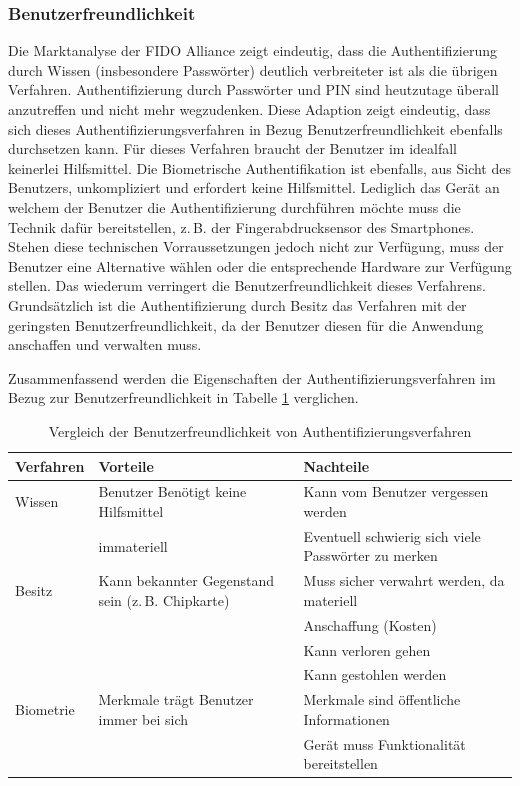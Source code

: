\documentclass[11pt,a4paper,ngerman]{scrreprt}
\begin{document}
\subsubsection{Benutzerfreundlichkeit}
Die Marktanalyse der FIDO Alliance \cite{fido17} zeigt eindeutig, dass die Authentifizierung durch Wissen (insbesondere Passwörter) deutlich verbreiteter ist als die übrigen Verfahren. Authentifizierung durch Passwörter und PIN sind heutzutage überall anzutreffen und nicht mehr wegzudenken. Diese Adaption zeigt eindeutig, dass sich dieses Authentifizierungsverfahren in Bezug Benutzerfreundlichkeit ebenfalls durchsetzen kann. Für dieses Verfahren braucht der Benutzer im idealfall keinerlei Hilfsmittel. Die Biometrische Authentifikation ist ebenfalls, aus Sicht des Benutzers, unkompliziert und erfordert keine Hilfsmittel. Lediglich das Gerät an welchem der Benutzer die Authentifizierung durchführen möchte muss die Technik dafür bereitstellen, z.\,B. der Fingerabdrucksensor des Smartphones. Stehen diese technischen Vorraussetzungen jedoch nicht zur Verfügung, muss der Benutzer eine Alternative wählen oder die entsprechende Hardware zur Verfügung stellen. Das wiederum verringert die Benutzerfreundlichkeit dieses Verfahrens. Grundsätzlich ist die Authentifizierung durch Besitz das Verfahren mit der geringsten Benutzerfreundlichkeit, da der Benutzer diesen für die Anwendung anschaffen und verwalten muss. 

Zusammenfassend werden die Eigenschaften der Authentifizierungsverfahren im Bezug zur Benutzerfreundlichkeit in Tabelle \ref{table:Benutzerfreundlichkeit} verglichen.
\begin{table}[htbp]
    \begin{tabularx}{\textwidth}{ lXX }
        \toprule
        Verfahren & Vorteile & Nachteile \\ 
        \midrule
        Wissen & Benutzer Benötigt keine Hilfsmittel & Kann vom Benutzer vergessen werden \\
         & immateriell & Eventuell schwierig sich viele Passwörter zu merken \\
        \midrule
        Besitz & Kann bekannter Gegenstand sein (z.\,B. Chipkarte) & Muss sicher verwahrt werden, da materiell \\
         & & Anschaffung (Kosten) \\
         & & Kann verloren gehen \\
         & & Kann gestohlen werden \\
        \midrule
        Biometrie & Merkmale trägt Benutzer immer bei sich & Merkmale sind öffentliche Informationen \\
         & & Gerät muss Funktionalität bereitstellen \\
        \bottomrule
    \end{tabularx}
    \caption{Vergleich der Benutzerfreundlichkeit von Authentifizierungsverfahren}
    \label{table:Benutzerfreundlichkeit}
\end{table}
\end{document}
